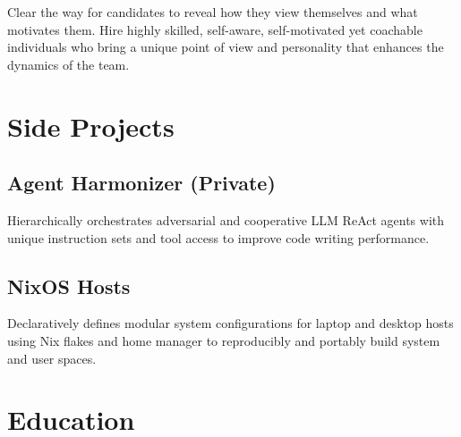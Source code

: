 \documentclass[
	10pt, %
]{FreemanCV}
\begin{document}
\begin{paracol}{2}
Clear the way for candidates to reveal how they view themselves and what motivates them. Hire highly skilled, self-aware, self-motivated yet coachable individuals who bring a unique point of view and personality that enhances the dynamics of the team.


\section{Side Projects}

\subsection{Agent Harmonizer (Private)}

Hierarchically orchestrates adversarial and cooperative LLM ReAct agents with unique instruction sets and tool access to improve code writing performance.

\subsection{NixOS Hosts}

Declaratively defines modular system configurations for laptop and desktop hosts using Nix flakes and home manager to reproducibly and portably build system and user spaces.


\section{Education} 






\end{paracol}
\end{document}
